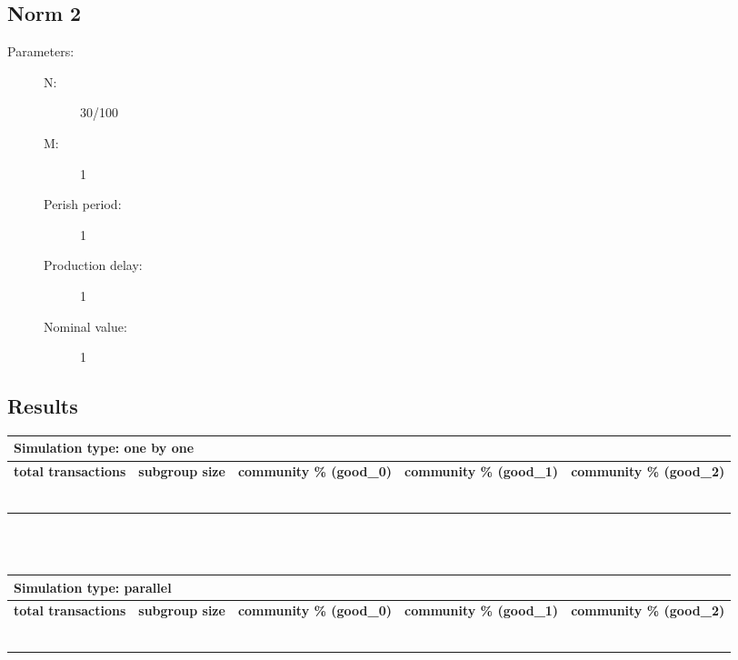 \documentclass{article}
\begin{document}
\subsection{Norm 2}
\begin{description}
  \item[Parameters:] \hfill
	\begin{description}
  		\item[N:] 30/100
		\item[M:] 1
		\item[Perish period:] 1
		\item[Production delay:] 1
		\item[Nominal value:] 1
	\end{description}

\end{description}

\subsection{Results}
\begin{tabular}{|  l | c | p{2.5cm} | p{2.5cm} | p{2.5cm} | }
     \multicolumn{5}{l}{\textbf{Simulation type: one by one}} \\ \hline
     \textbf{total transactions} & \textbf{subgroup size} & \textbf{community \% (good\_0)} & \textbf{community \% (good\_1)}  & \textbf{community \% (good\_2)} \\ \hline
     &  & & &  \\ \hline
     &  & & & \\ \hline
     &  & & & \\ \hline
     &  & & &  \\ \hline
     &  & & &  \\ \hline
     &  & & & \\ \hline
\end{tabular}
\\
\\
\begin{tabular}{|  l | c | p{2.5cm} | p{2.5cm} | p{2.5cm} | }
     \multicolumn{5}{l}{\textbf{Simulation type: parallel}} \\ \hline
     \textbf{total transactions} & \textbf{subgroup size} & \textbf{community \% (good\_0)} & \textbf{community \% (good\_1)}  & \textbf{community \% (good\_2)} \\ \hline
     &  & & &  \\ \hline
     &  & & & \\ \hline
     &  & & & \\ \hline
     &  & & &  \\ \hline
     &  & & &  \\ \hline
     &  & & & \\ \hline
\end{tabular}
\end{document}
